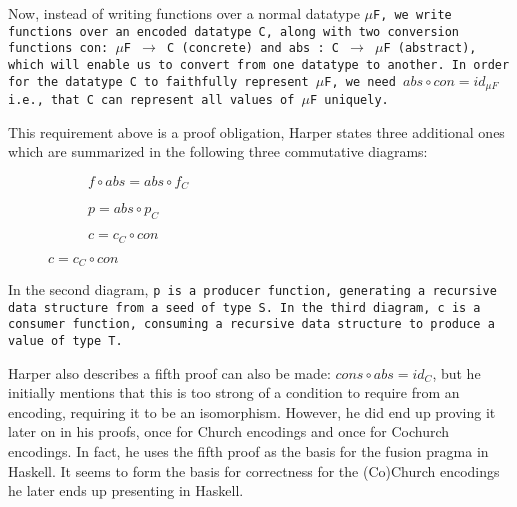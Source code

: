 Now, instead of writing functions over a normal datatype \tt{$\mu$F}, we write functions over an encoded datatype \tt{C}, along with two conversion functions \tt{con: $\mu$F $\to$ C} (concrete) and \tt{abs : C $\to$ $\mu$F} (abstract), which will enable us to convert from one datatype to another.
In order for the datatype \tt{C} to faithfully represent \tt{$\mu$F}, we need $abs \circ con = id_{\mu F}$ i.e., that \tt{C} can represent all values of \tt{$\mu$F} uniquely.

This requirement above is a proof obligation, Harper states three additional ones which are summarized in the following three commutative diagrams:

\begin{figure}[H]\hfill
    \begin{subfigure}{0.32\textwidth}
        \hfill{}\hfill\null
        \caption{$f\circ abs = abs\circ f_C$}
    \end{subfigure}
    \begin{subfigure}{0.32\textwidth}
        \hfill{}\hfill\null
        \caption{$p = abs\circ p_C$}
    \end{subfigure}
    \begin{subfigure}{0.32\textwidth}
        \hfill{}\hfill\null
        \caption{$c = c_C\circ con$}
    \end{subfigure}
\end{figure}

In the second diagram, \tt{p} is a producer function, generating a recursive data structure from a seed of type \tt{S}.
In the third diagram, \tt{c} is a consumer function, consuming a recursive data structure to produce a value of type \tt{T}.

Harper also describes a fifth proof can also be made: $cons \circ abs = id_C$,
but he initially mentions that this is too strong of a condition to require from an encoding, requiring it to be an isomorphism.
However, he did end up proving it later on in his proofs, once for Church encodings and once for Cochurch encodings.
In fact, he uses the fifth proof as the basis for the fusion pragma in Haskell.
It seems to form the basis for correctness for the (Co)Church encodings he later ends up presenting in Haskell.

